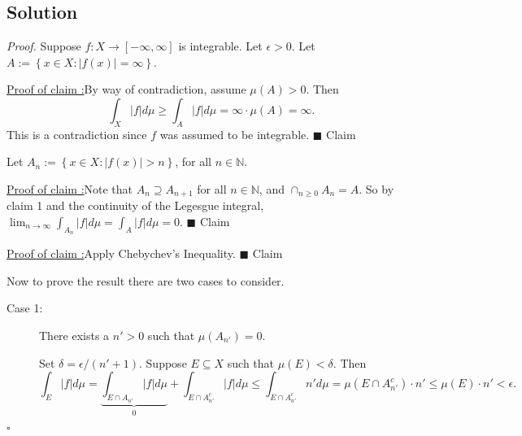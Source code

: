 \documentclass[12pt]{article}
\newcounter{ProofCounter}
\newcounter{ClaimCounter}[ProofCounter]
\newenvironment{Proof}{\stepcounter{ProofCounter}\textit{Proof.}}{\hfill$\square$}
\newenvironment{claim}[1]{\stepcounter{ClaimCounter}\par\noindent\underline{Claim \theClaimCounter:}\space#1}{}
\newenvironment{claimproof}[1]{\par\noindent\underline{Proof of claim \theClaimCounter:}\space#1}{\hfill $\blacksquare$ Claim \theClaimCounter\vspace{5mm}}
\begin{document}
\subsection*{Solution}
\begin{Proof}
Suppose $f : X\rightarrow [-\infty, \infty]$ is integrable. Let $\epsilon > 0$. Let $A := \left\{ x \in X : |f(x)| = \infty \right\}$.

\begin{claimproof}
By way of contradiction, assume $\mu(A) > 0$. Then
\[ \int_{X}|f|d\mu \geq \int_{A}|f|d\mu = \infty \cdot \mu(A) = \infty. \]
This is a contradiction since $f$ was assumed to be integrable.
\end{claimproof}

\vspace{-3mm}
Let $A_{n} := \left\{ x \in X : |f(x)| > n \right\}$, for all $n \in \mathbb{N}$.

\begin{claimproof}
Note that $A_{n} \supseteq A_{n+1}$ for all $n \in \mathbb{N}$, and $\cap_{n \geq 0}A_{n} = A$. So by claim 1 and the continuity of the Legesgue integral,
$\lim_{n\rightarrow\infty}\int_{A_{n}}|f|d\mu = \int_{A}|f|d\mu = 0$.
\end{claimproof}

\vspace{-3mm}
\begin{claimproof}
Apply Chebychev's Inequality.
\end{claimproof}

\vspace{-3mm}
Now to prove the result there are two cases to consider.
\begin{description}
\item[Case 1:] There exists a $n' > 0$ such that $\mu(A_{n'}) = 0$.

Set $\delta = \epsilon / (n'+1)$. Suppose $E\subseteq X$ such that $\mu(E) < \delta$. Then 
\[ \int_{E}|f|d\mu = \underbrace{\int_{E\cap A_{n'}}|f|d\mu}_{0} + \int_{E\cap A_{n'}^{c}}|f|d\mu \leq \int_{E\cap A_{n'}^{c}}n'd\mu = \mu(E\cap
A_{n'}^{c})\cdot n' \leq \mu(E)\cdot n' < \epsilon. \]


\end{description}
\end{Proof}
\end{document}
